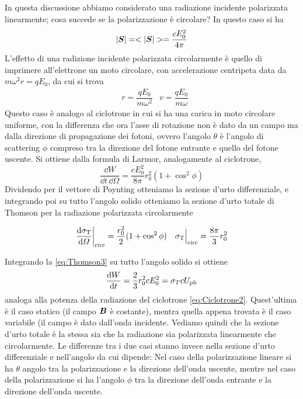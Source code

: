 In questa discussione abbiamo considerato una radiazione incidente polarizzata linearmente; cosa succede se la polarizzazione è circolare? In questo caso si ha
\begin{equation}
|\V{S}|=<|\V{S}|> = \dfrac{c E_0^2}{4\pi}
\end{equation}
L'effetto di una radizione incidente polarizzata circolarmente è quello di imprimere all'elettrone un moto circolare, con accelerazione centripeta data da $m\omega^2 r = q E_0$, da cui si trova 
\begin{align}
&r = \dfrac{qE_0}{m\omega^2}
&v = \dfrac{q E_0}{m\omega}
\end{align}
Questo caso è analogo al ciclotrone in cui si ha una carica in moto circolare uniforme, con la differenza che ora l'asse di rotazione non è dato da un campo ma dalla direzione di propagazione dei fotoni, ovvero l'angolo $\theta$ è l'angolo di scattering $\phi$ compreso tra la direzione del fotone entrante e quello del fotone uscente. Si ottiene dalla formula di Larmor, analogamente al ciclotrone,
\begin{equation}
\dfrac{\dd W}{\dd t \, \dd \Omega}  = \dfrac{c E_0^2}{8\pi}r_0^2 (1+\cos^2\phi) \label{eq:Thomson3}
\end{equation}
Dividendo per il vettore di Poynting otteniamo la sezione d'urto differenziale, e integrando poi su tutto l'angolo solido otteniamo la sezione d'urto totale di Thomson per la radiazione polarizzata circolarmente 
\begin{EQ}
\begin{align}
&\dfrac{\mathrm{d} {\sigma_\mathrm{T}}}{\mathrm{d} {\Omega}}\bigg|_\mathrm{circ} = \dfrac{r_0^2}{2} (1+\cos^2\phi)
&\sigma_\mathrm{T}\Big|_\mathrm{circ} = \dfrac{8\pi}{3}r_0^2
\end{align}
\end{EQ}
Integrando la \ref{eq:Thomson3} su tutto l'angolo solido si ottiene
\begin{equation}
\dfrac{\mathrm{d} {W}}{\mathrm{d} {t}}= \dfrac{2}{3} r_0^2 c E_0^2 = \sigma_{T} c U_\mathrm{ph}
\end{equation}
analoga alla potenza della radiazione del ciclotrone \ref{eq:Ciclotrone2}. Quest'ultima è il caso statico (il campo $\V{B}$ è costante), mentra quella appena trovata è il caso variabile (il campo è dato dall'onda incidente. Vediamo quindi che la sezione d'urto totale è la stessa sia che la radiazione sia polarizzata linearmente che circolarmente. Le differenze tra i due casi stanno invece nella sezione d'urto differenziale e nell'angolo da cui dipende: Nel caso della polarizzazione lineare si ha $\theta$ angolo tra la polarizzazione e la direzione dell'onda uscente, mentre nel caso della polarizzazione si ha l'angolo $\phi$ tra la direzione dell'onda entrante e la direzione dell'onda uscente.

